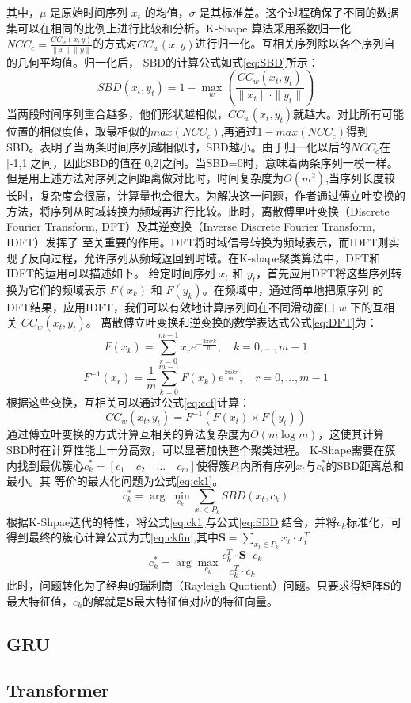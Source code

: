 其中，\( \mu \) 是原始时间序列 \( x_t \) 的均值，\( \sigma \) 是其标准差。这个过程确保了不同的数据集可以在相同的比例上进行比较和分析。K-Shape
算法采用系数归一化$NCC_c = \frac{CC_w(x,y)}{\|x\|\|y\|}$的方式对\( CC_w(x, y) \)进行归一化。互相关序列除以各个序列自的几何平均值。归一化后，
SBD的计算公式如式\eqref{eq:SBD}所示：
\begin{equation}
    SBD(x_t, y_t) = 1 - \max_w \left( \frac{CC_w(x_t, y_t)}{\|x_t\| \cdot \|y_t\|} \right)
    \label{eq:SBD}
\end{equation}
当两段时间序列重合越多，他们形状越相似，$CC_w(x_t, y_t)$就越大。对比所有可能位置的相似度值，取最相似的$max(NCC_c)$,再通过$1-max(NCC_c)$得到
SBD。表明了当两条时间序列越相似时，SBD越小。由于归一化以后的$NCC_c$在[-1,1]之间，因此SBD的值在[0,2]之间。当SBD=0时，意味着两条序列一模一样。
但是用上述方法对序列之间距离做对比时，时间复杂度为$O(m^2)$,当序列长度较长时，复杂度会很高，计算量也会很大。为解决这一问题，作者通过傅立叶变换的
方法，将序列从时域转换为频域再进行比较。此时，离散傅里叶变换（Discrete Fourier Transform, DFT）及其逆变换（Inverse Discrete Fourier Transform, IDFT）发挥了
至关重要的作用。DFT将时域信号转换为频域表示，而IDFT则实现了反向过程，允许序列从频域返回到时域。在K-shape聚类算法中，DFT和IDFT的运用可以描述如下。
给定时间序列 \( x_t \) 和 \( y_t \)，首先应用DFT将这些序列转换为它们的频域表示 \( F(x_k) \) 和 \( F(y_k) \)。在频域中，通过简单地把原序列
的DFT结果，应用IDFT，我们可以有效地计算序列间在不同滑动窗口 \( w \) 下的互相关 \( CC_w(x_t, y_t) \)。
离散傅立叶变换和逆变换的数学表达式公式\eqref{eq:DFT}为：
\begin{equation}
    F(x_k) = \sum_{r=0}^{m-1} x_r e^{-\frac{2 \pi i r k}{m}}, \quad k = 0, \ldots, m - 1
    \label{eq:DFT}
\end{equation}
\begin{equation}
    F^{-1}(x_r) = \frac{1}{m} \sum_{k=0}^{m-1} F(x_k) e^{\frac{2 \pi i k r}{m}}, \quad r = 0, \ldots, m - 1
    \label{eq:IDFT}
\end{equation}
根据这些变换，互相关可以通过公式\eqref{eq:ccf}计算：
\begin{equation}
    CC_w(x_t, y_t) = F^{-1}(F(x_t) \times F(y_t))
    \label{eq:ccf}
\end{equation}
通过傅立叶变换的方式计算互相关的算法复杂度为\( O(m \log m) \)，这使其计算SBD时在计算性能上十分高效，可以显著加快整个聚类过程。
K-Shape需要在簇内找到最优簇心$c_k^* = [c_1 \quad c_2 \quad \ldots \quad c_m]$使得簇$P_t$内所有序列$x_t$与$c_k^*$的SBD距离总和最小。其
等价的最大化问题为公式\eqref{eq:ck1}。
\begin{equation}
    c_k^* = \arg\min_{c_k} \sum_{x_t \in P_k} SBD(x_t, c_k)
    \label{eq:ck1}
\end{equation}
根据K-Shpae迭代的特性，将公式\eqref{eq:ck1}与公式\eqref{eq:SBD}结合，并将$c_k$标准化，可得到最终的簇心计算公式为式\eqref{eq:ckfin},其中$\mathbf{S} = \sum_{x_t \in P_k} x_t \cdot x_t^T$
\begin{equation}
    c_k^* = \arg\max_{c_k} \frac{c_k^T \cdot \mathbf{S} \cdot c_k}{c_k^T \cdot c_k}
    \label{eq:ckfin}
\end{equation}
此时，问题转化为了经典的瑞利商（Rayleigh Quotient）问题。只要求得矩阵$\mathbf{S}$的最大特征值，$c_k$的解就是$\mathbf{S}$最大特征值对应的特征向量。
\subsection{GRU}
\subsection{Transformer}